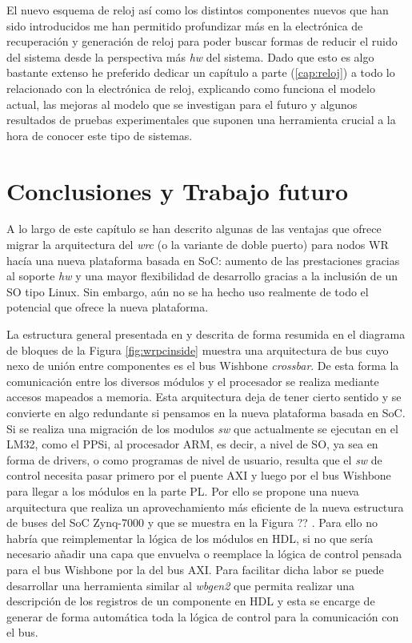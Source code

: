 El nuevo esquema de reloj así como los distintos componentes nuevos que han 
sido introducidos me han permitido profundizar más en la electrónica de 
recuperación y generación de reloj para poder buscar formas de reducir el ruido 
del sistema desde la perspectiva más \textit{hw} del sistema. Dado que esto es 
algo bastante extenso he preferido dedicar un capítulo a parte 
(\ref{cap:reloj}) a todo lo relacionado 
con la electrónica de reloj, explicando como funciona el modelo actual, las 
mejoras al modelo que se investigan para el futuro y algunos resultados de 
pruebas experimentales que suponen una herramienta crucial a la hora de conocer 
este tipo de sistemas.

\section{Conclusiones y Trabajo futuro} \label{sec:socfuturo}

A lo largo de este capítulo se han descrito algunas de las ventajas que ofrece 
migrar la arquitectura del \textit{wrc} (o la variante de doble puerto) para 
nodos WR hacía una nueva plataforma basada en SoC: aumento de las prestaciones 
gracias al soporte \textit{hw} y una mayor flexibilidad de desarrollo gracias a 
la inclusión de un SO tipo Linux. Sin embargo, aún no se ha hecho uso realmente 
de todo el potencial que ofrece la nueva plataforma.

La estructura general presentada en \cite{Daniluk2012} y descrita de forma 
resumida en el diagrama de bloques de la Figura \ref{fig:wrpcinside} muestra 
una arquitectura de bus cuyo nexo de unión entre componentes es el bus Wishbone 
\textit{crossbar}. De esta forma la comunicación entre los diversos módulos y 
el procesador se realiza mediante accesos mapeados a memoria. Esta arquitectura 
deja de tener cierto sentido y se convierte en algo redundante si pensamos en 
la nueva plataforma basada en SoC. Si se realiza una migración de los modulos 
\textit{sw} que actualmente se ejecutan en el LM32, como el PPSi, al procesador 
ARM, es decir, a nivel de SO, ya sea en forma de drivers, o como programas de 
nivel de usuario, resulta que el \textit{sw} de control  necesita pasar primero 
por el puente AXI y luego por el bus Wishbone para llegar a los módulos en la 
parte PL. Por ello se propone una nueva arquitectura que realiza un 
aprovechamiento más eficiente de la nueva estructura de buses del SoC Zynq-7000 
y que se muestra en la Figura ?? . Para ello no habría que reimplementar 
la lógica de los módulos en HDL, si no que sería necesario añadir una capa que 
envuelva o reemplace la lógica de control pensada para el bus Wishbone por la 
del bus AXI. Para facilitar dicha labor se puede desarrollar una herramienta 
similar al \textit{wbgen2} que permita realizar una descripción de los 
registros de un componente en HDL y esta se encarge de generar de forma 
automática toda la lógica de control para la comunicación con el bus.

